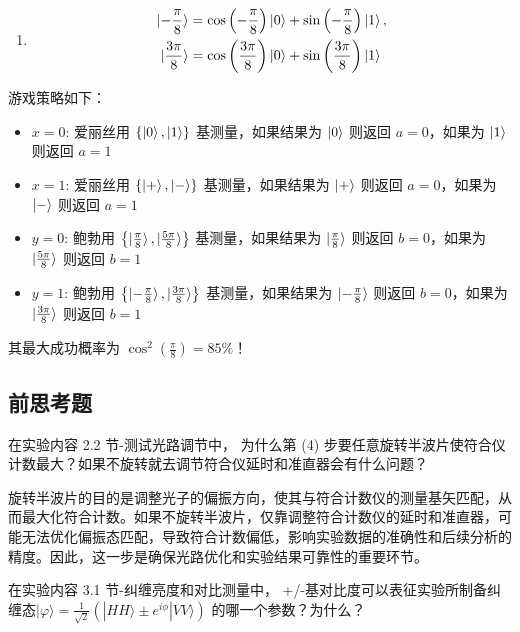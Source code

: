 \begin{enumerate}
\begin{enumerate}
		\item 
		\[
		\begin{aligned}
			\ket{-\frac{\pi}{8}} &= \cos\left(-\frac{\pi}{8}\right)\ket{0} + \sin\left(-\frac{\pi}{8}\right)\ket{1}, \\
			\ket{\frac{3\pi}{8}} &= \cos\left(\frac{3\pi}{8}\right)\ket{0} + \sin\left(\frac{3\pi}{8}\right)\ket{1}
		\end{aligned}
		\]
	\end{enumerate}
	
	游戏策略如下：
	\begin{itemize}
		\item $x = 0$: 爱丽丝用 $\{\ket{0}, \ket{1}\}$ 基测量，如果结果为 $\ket{0}$ 则返回 $a = 0$，如果为 $\ket{1}$ 则返回 $a = 1$
		\item $x = 1$: 爱丽丝用 $\{\ket{+}, \ket{-}\}$ 基测量，如果结果为 $\ket{+}$ 则返回 $a = 0$，如果为 $\ket{-}$ 则返回 $a = 1$
		\item $y = 0$: 鲍勃用 $\left\{ \ket{\frac{\pi}{8}}, \ket{\frac{5\pi}{8}} \right\}$ 基测量，如果结果为 $\ket{\frac{\pi}{8}}$ 则返回 $b = 0$，如果为 $\ket{\frac{5\pi}{8}}$ 则返回 $b = 1$
		\item $y = 1$: 鲍勃用 $\left\{ \ket{-\frac{\pi}{8}}, \ket{\frac{3\pi}{8}} \right\}$ 基测量，如果结果为 $\ket{-\frac{\pi}{8}}$ 则返回 $b = 0$，如果为 $\ket{\frac{3\pi}{8}}$ 则返回 $b = 1$
	\end{itemize}
	其最大成功概率为 $\cos^2\left(\frac{\pi}{8}\right) = 85\%$！
	
\end{enumerate}

\subsection{前思考题}
\begin{question}
	在实验内容 2.2 节-测试光路调节中， 为什么第 (4) 步要任意旋转半波片使符合仪计数最大？如果不旋转就去调节符合仪延时和准直器会有什么问题？
\end{question}

旋转半波片的目的是调整光子的偏振方向，使其与符合计数仪的测量基矢匹配，从而最大化符合计数。如果不旋转半波片，仅靠调整符合计数仪的延时和准直器，可能无法优化偏振态匹配，导致符合计数偏低，影响实验数据的准确性和后续分析的精度。因此，这一步是确保光路优化和实验结果可靠性的重要环节。

\begin{question}
	在实验内容 3.1 节-纠缠亮度和对比测量中， +/-基对比度可以表征实验所制备纠缠态$|\varphi \rangle = \frac{1}{\sqrt{2}}(|HH \rangle \pm e^{i \phi}|VV \rangle)$ 的哪一个参数？为什么？
\end{question}

